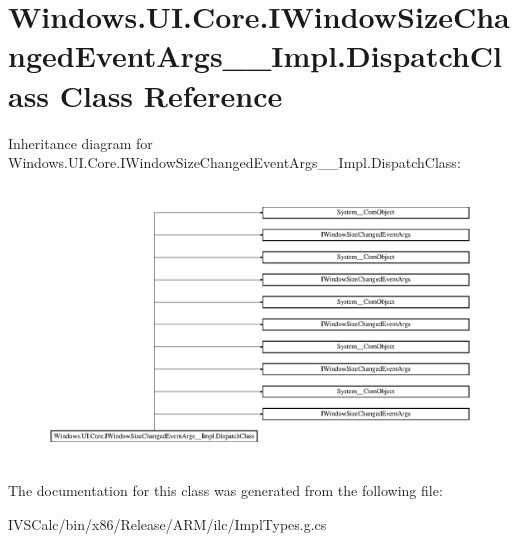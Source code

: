 \hypertarget{class_windows_1_1_u_i_1_1_core_1_1_i_window_size_changed_event_args_____impl_1_1_dispatch_class}{}\section{Windows.\+U\+I.\+Core.\+I\+Window\+Size\+Changed\+Event\+Args\+\_\+\+\_\+\+Impl.\+Dispatch\+Class Class Reference}
\label{class_windows_1_1_u_i_1_1_core_1_1_i_window_size_changed_event_args_____impl_1_1_dispatch_class}
Inheritance diagram for Windows.\+U\+I.\+Core.\+I\+Window\+Size\+Changed\+Event\+Args\+\_\+\+\_\+\+Impl.\+Dispatch\+Class\+:\begin{figure}[H]
\begin{center}
\leavevmode
\includegraphics[height=7.298578cm]{class_windows_1_1_u_i_1_1_core_1_1_i_window_size_changed_event_args_____impl_1_1_dispatch_class}
\end{center}
\end{figure}


The documentation for this class was generated from the following file\+:\begin{DoxyCompactItemize}
\item 
I\+V\+S\+Calc/bin/x86/\+Release/\+A\+R\+M/ilc/Impl\+Types.\+g.\+cs\end{DoxyCompactItemize}
